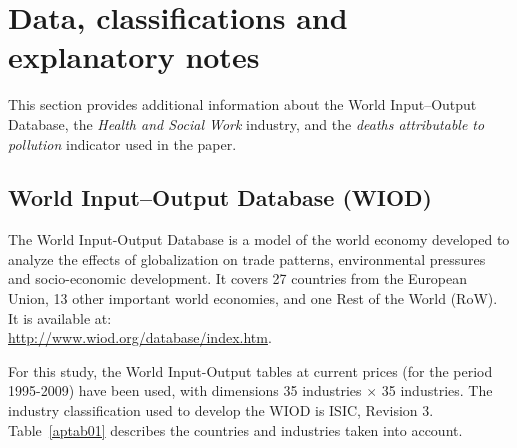 \documentclass[a4paper,12pt]{article}
\begin{document}

\newpage 





\appendix

\newpage 
\section{Data, classifications and explanatory notes} 
\label{appendix:classif}

This section provides additional information about the World Input--Output Database, the \textit{Health and Social Work} industry, and the \textit{deaths attributable to pollution} indicator used in the paper.

\subsection{World Input--Output Database (WIOD)}

The World Input-Output Database is a model of the world economy developed to analyze the effects of globalization on trade patterns, environmental pressures and socio-economic development. It covers 27 countries from the European Union, 13 other important world economies, and one Rest of the World (RoW). It is available at: \\ \url{http://www.wiod.org/database/index.htm}.

For this study, the World Input-Output tables at current prices (for the period 1995-2009) have been used, with dimensions 35 industries $\times$ 35 industries. The industry classification used to develop the WIOD is ISIC, Revision 3. Table~\ref{aptab01} describes the countries and industries taken into account.
\end{document}
